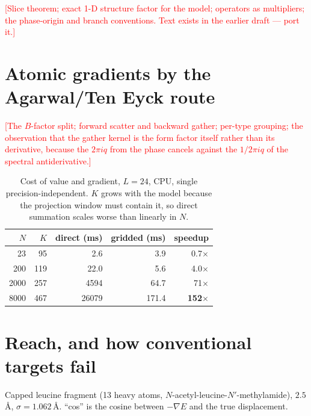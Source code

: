 \documentclass[11pt,a4paper]{article}
\newcommand{\TODO}[1]{\textcolor{red}{[#1]}}
\begin{document}
\TODO{Slice theorem; exact 1-D structure factor for the model; operators as multipliers;
the phase-origin and branch conventions. Text exists in the earlier draft --- port it.}

\section{Atomic gradients by the Agarwal/Ten Eyck route}\label{sec:fft}

\TODO{The $B$-factor split; forward scatter and backward gather; per-type grouping;
the observation that the gather kernel is the form factor itself rather than its
derivative, because the $2\pi i q$ from the phase cancels against the $1/2\pi i q$ of the
spectral antiderivative.}

\begin{table}[h]\centering\small
\caption{Cost of value and gradient, $L=24$, CPU, single precision-independent.
$K$ grows with the model because the projection window must contain it, so direct
summation scales worse than linearly in $N$.}
\begin{tabular}{@{}rrrrr@{}}\toprule
$N$ & $K$ & direct (ms) & gridded (ms) & speedup\\\midrule
23 & 95 & 2.6 & 3.9 & 0.7$\times$\\
200 & 119 & 22.0 & 5.6 & 4.0$\times$\\
2000 & 257 & 4594 & 64.7 & 71$\times$\\
8000 & 467 & 26079 & 171.4 & \textbf{152}$\times$\\\bottomrule
\end{tabular}
\end{table}

\section{Reach, and how conventional targets fail}\label{sec:reach}

Capped leucine fragment (13 heavy atoms, $N$-acetyl-leucine-$N'$-methylamide), $2.5$\,\AA,
$\sigma=1.062$\,\AA. ``cos'' is the cosine between $-\nabla E$ and the true displacement.
\end{document}
